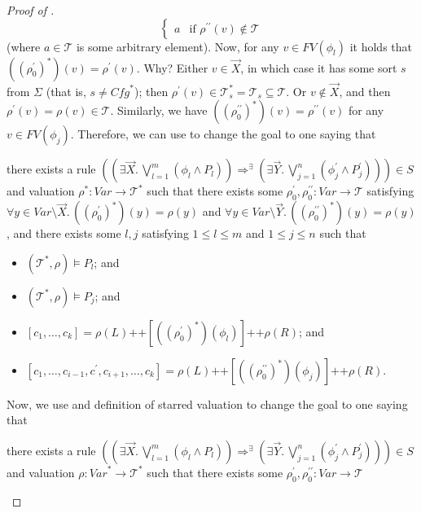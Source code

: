 \documentclass{article}
\newenvironment{proofenv}
  {
    \VerbatimEnvironment\begin{tcolorbox}[colback=black!0!white] %
  }
  {
   \end{tcolorbox}
  }
\begin{document}
\begin{proof}[Proof of ]
\begin{equation*}
\begin{cases}
        a & \text{if } \rho^{\prime\prime}(v) \not\in \mathcal{T}
    \end{cases}
\end{equation*}
(where $a \in \mathcal{T}$ is some arbitrary element).
Now, for any $v \in \mathit{FV}(\phi_l)$ it holds that
$((\rho_0^\prime)^*)(v) = \rho^\prime(v)$.
Why? Either $v \in \vec{X}$, in which case it has some sort $s$ from $\Sigma$
(that is, $s \not = \mathit{Cfg}^*$);
then $\rho^\prime(v) \in \mathcal{T}^*_s = \mathcal{T}_s \subseteq \mathcal{T}$.
Or $v \not\in \vec{X}$, and then $\rho^\prime(v) = \rho(v) \in \mathcal{T}$.
Similarly, we have
$((\rho_0^{\prime\prime})^*)(v) = \rho^{\prime\prime}(v)$
for any $v \in \mathit{FV}(\phi_j)$.
Therefore, we can use  to change the goal to one saying that
\begin{proofenv}
there exists a rule $((\exists \vec{X}.\, \bigvee_{l=1}^{m} (\phi_l \land P_l)) \Rightarrow^\exists (\exists \vec{Y}.\, \bigvee_{j=1}^{n} (\phi^\prime_j \land P^\prime_j))) \in S$
and valuation $\rho^* : \mathit{Var} \to \mathcal{T}^*$ such that
there exists some $\rho_0^\prime,\rho_0^{\prime\prime} : \mathit{Var} \to \mathcal{T}$
satisfying $\forall y \in \mathit{Var} \setminus \vec{X}.\, ((\rho_0^\prime)^*)(y) = \rho(y)$
and $\forall y \in \mathit{Var} \setminus \vec{Y}.\, ((\rho_0^{\prime\prime})^*)(y) = \rho(y)$,
and there exists some $l,j$ satisfying $1 \leq l \leq m$ and $1 \leq j \leq n$ such that
\begin{itemize}
    \item $(\mathcal{T}^*, \rho) \vDash P_l$; and
    \item $(\mathcal{T}^*, \rho) \vDash P_j$; and
    \item $[c_1,\ldots,c_k] = \rho(L) \texttt{++} [((\rho_0^\prime)^*)(\phi_l)] \texttt{++} \rho(R)$; and
    \item $[c_1, \ldots, c_{i-1}, c^\prime, c_{i+1}, \ldots, c_k] = \rho(L)
    \texttt{++} [((\rho_0^{\prime\prime})^*)(\phi_j)] 
    \texttt{++} \rho(R)$.
\end{itemize}
\end{proofenv}
Now, we use  and definition of starred valuation to change the goal to one saying that
\begin{proofenv}
there exists a rule $((\exists \vec{X}.\, \bigvee_{l=1}^{m} (\phi_l \land P_l)) \Rightarrow^\exists (\exists \vec{Y}.\, \bigvee_{j=1}^{n} (\phi^\prime_j \land P^\prime_j))) \in S$
and valuation $\rho : \mathit{Var}^* \to \mathcal{T}^*$ such that
there exists some $\rho_0^\prime,\rho_0^{\prime\prime} : \mathit{Var} \to \mathcal{T}$

\end{proofenv}
\end{proof}
\end{document}
